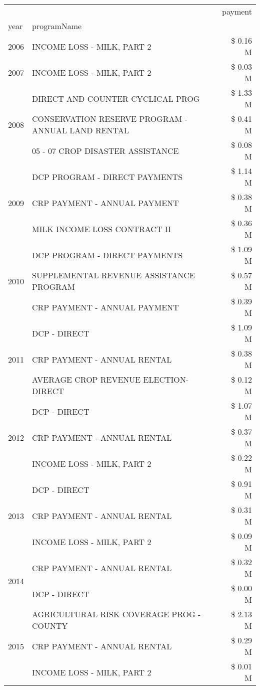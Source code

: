 \begin{tabular}{llr}
\toprule
 &  & payment \\
year & programName &  \\
\midrule
2006 & INCOME LOSS - MILK, PART 2 & \$ 0.16 M \\
\cline{1-3}
2007 & INCOME LOSS - MILK, PART 2 & \$ 0.03 M \\
\cline{1-3}
\multirow[t]{3}{*}{2008} & DIRECT AND COUNTER CYCLICAL PROG & \$ 1.33 M \\
 & CONSERVATION RESERVE PROGRAM - ANNUAL LAND RENTAL & \$ 0.41 M \\
 & 05 - 07 CROP DISASTER ASSISTANCE & \$ 0.08 M \\
\cline{1-3}
\multirow[t]{3}{*}{2009} & DCP PROGRAM - DIRECT PAYMENTS & \$ 1.14 M \\
 & CRP PAYMENT - ANNUAL PAYMENT & \$ 0.38 M \\
 & MILK INCOME LOSS CONTRACT II & \$ 0.36 M \\
\cline{1-3}
\multirow[t]{3}{*}{2010} & DCP PROGRAM - DIRECT PAYMENTS & \$ 1.09 M \\
 & SUPPLEMENTAL REVENUE ASSISTANCE PROGRAM & \$ 0.57 M \\
 & CRP PAYMENT - ANNUAL PAYMENT & \$ 0.39 M \\
\cline{1-3}
\multirow[t]{3}{*}{2011} & DCP - DIRECT & \$ 1.09 M \\
 & CRP PAYMENT - ANNUAL RENTAL & \$ 0.38 M \\
 & AVERAGE CROP REVENUE ELECTION-DIRECT & \$ 0.12 M \\
\cline{1-3}
\multirow[t]{3}{*}{2012} & DCP - DIRECT & \$ 1.07 M \\
 & CRP PAYMENT - ANNUAL RENTAL & \$ 0.37 M \\
 & INCOME LOSS - MILK, PART 2 & \$ 0.22 M \\
\cline{1-3}
\multirow[t]{3}{*}{2013} & DCP - DIRECT & \$ 0.91 M \\
 & CRP PAYMENT - ANNUAL RENTAL & \$ 0.31 M \\
 & INCOME LOSS - MILK, PART 2 & \$ 0.09 M \\
\cline{1-3}
\multirow[t]{2}{*}{2014} & CRP PAYMENT - ANNUAL RENTAL & \$ 0.32 M \\
 & DCP - DIRECT & \$ 0.00 M \\
\cline{1-3}
\multirow[t]{3}{*}{2015} & AGRICULTURAL RISK COVERAGE PROG - COUNTY & \$ 2.13 M \\
 & CRP PAYMENT - ANNUAL RENTAL & \$ 0.29 M \\
 & INCOME LOSS - MILK, PART 2 & \$ 0.01 M \\

\end{tabular}

